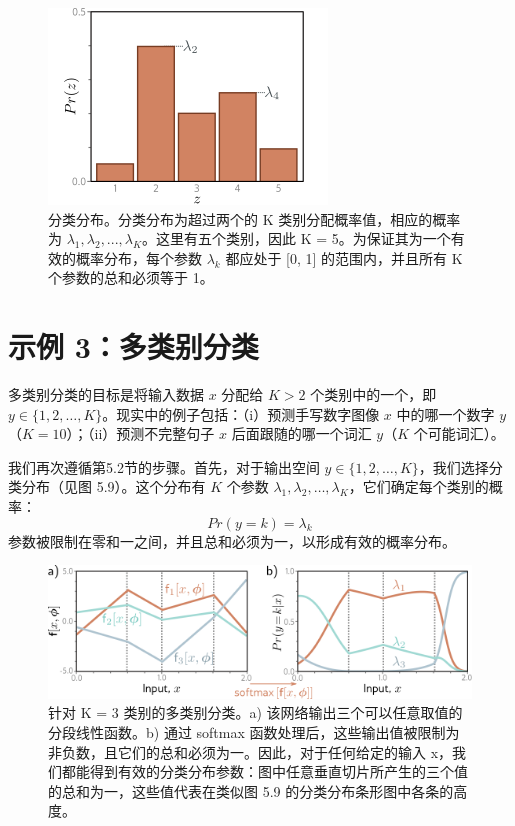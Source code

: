 \begin{figure}[ht!]
	\centering
	\includegraphics[width=0.7\linewidth]{png/chapter5/LossCategorical.png}
	\caption{分类分布。分类分布为超过两个的 K 类别分配概率值，相应的概率为 \(\lambda_1,\lambda_2,...,\lambda_K\)。这里有五个类别，因此 K = 5。为保证其为一个有效的概率分布，每个参数 \(\lambda_k\) 都应处于 [0, 1] 的范围内，并且所有 K 个参数的总和必须等于 1。}
\end{figure}


\section{示例 3：多类别分类}

多类别分类的目标是将输入数据 \(x\) 分配给 \(K > 2\) 个类别中的一个，即 \(y \in \{1, 2, \ldots, K\}\)。现实中的例子包括：（i）预测手写数字图像 \(x\) 中的哪一个数字 \(y\)（\(K = 10\)）；（ii）预测不完整句子 \(x\) 后面跟随的哪一个词汇 \(y\)（\(K\) 个可能词汇）。

我们再次遵循第5.2节的步骤。首先，对于输出空间 \(y \in \{1, 2, \ldots, K\}\)，我们选择分类分布（见图 5.9）。这个分布有 \(K\) 个参数 \(\lambda_1, \lambda_2, \ldots, \lambda_K\)，它们确定每个类别的概率：
\begin{equation}
Pr(y = k) = \lambda_k 
\end{equation}
参数被限制在零和一之间，并且总和必须为一，以形成有效的概率分布。

\begin{figure}[ht!]
	\centering
	\includegraphics[width=0.7\linewidth]{png/chapter5/LossMultiClassClassification.png}
	\caption{针对 K = 3 类别的多类别分类。a) 该网络输出三个可以任意取值的分段线性函数。b) 通过 softmax 函数处理后，这些输出值被限制为非负数，且它们的总和必须为一。因此，对于任何给定的输入 x，我们都能得到有效的分类分布参数：图中任意垂直切片所产生的三个值的总和为一，这些值代表在类似图 5.9 的分类分布条形图中各条的高度。}
\end{figure}


